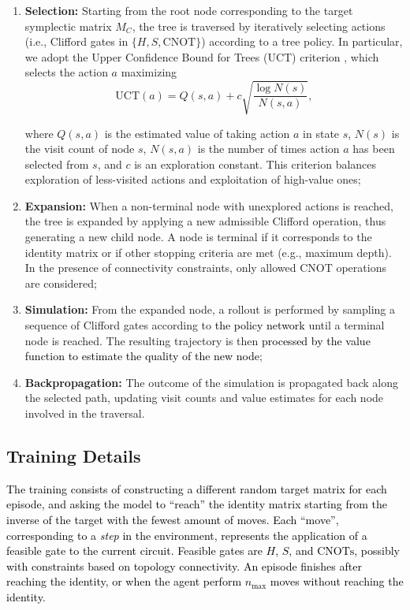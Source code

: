 \documentclass[conference]{IEEEtran}
\newcommand{\nt}[1]{\textcolor{black}{#1}}
\newcommand{\CNOT}{\ensuremath{\text{CNOT}}\xspace}
\newcommand{\CNOTs}{\ensuremath{\text{CNOTs}}\xspace}
\begin{document}
\begin{enumerate}
    \item \textbf{Selection:} Starting from the root node corresponding to the target symplectic matrix $M_{C}$, the tree is traversed by iteratively selecting actions (i.e., Clifford gates in $\{H, S, \CNOT\}$) according to a tree policy. In particular, we adopt the Upper Confidence Bound for Trees (UCT) criterion \cite{kocsis2006MCTS}, which selects the action $a$ maximizing
    \begin{equation}
            \mathrm{UCT}(a) = Q(s,a) + c \sqrt{\frac{\log N(s)}{N(s,a)}},
        \end{equation}

    where $Q(s,a)$ is the estimated value of taking action $a$ in state $s$, $N(s)$ is the visit count of node $s$, $N(s,a)$ is the number of times action $a$ has been selected from $s$, and $c$ is an exploration constant. This criterion balances exploration of less-visited actions and exploitation of high-value ones;


    \item \textbf{Expansion:} When a non-terminal node with unexplored actions is reached, the tree is expanded by applying a new admissible Clifford operation, thus generating a new child node. A node is terminal if it corresponds to the identity matrix or if other stopping criteria are met (e.g., maximum depth). In the presence of connectivity constraints, only allowed $\CNOT$ operations are considered;

    \item \textbf{Simulation:} From the expanded node, a rollout is performed by sampling a sequence of Clifford gates according to \nt{the policy network} until a terminal node is reached. The resulting trajectory is then \nt{processed by the value function to estimate the quality of the new node};

    \item \textbf{Backpropagation:} The outcome of the simulation is propagated back along the selected path, updating visit counts and value estimates for each node involved in the traversal.
\end{enumerate}



\subsection{Training Details}\label{Subsec:training_details}

\nt{The training consists of constructing a different random target matrix for each episode, and asking the model to ``reach'' the identity matrix starting from the inverse of the target with the fewest amount of moves. Each ``move'', corresponding to a \textit{step} in the environment, represents the application of a feasible gate to the current circuit. Feasible gates are $H$, $S$, and \CNOTs, possibly with constraints based on topology connectivity. An episode finishes after reaching the identity, or when the agent perform $n_{\text{max}}$ moves without reaching the identity.}
\end{document}
